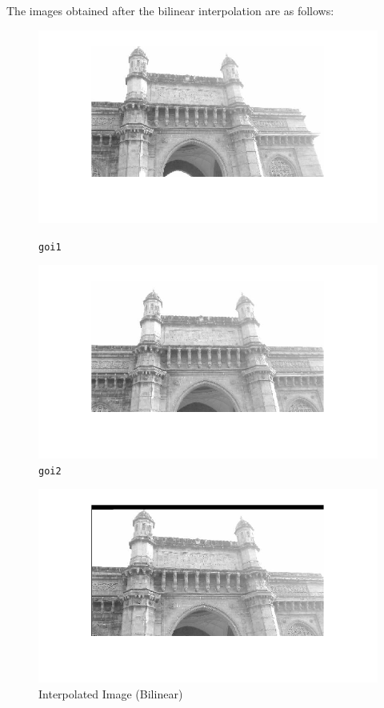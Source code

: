 \documentclass{article}
\begin{document}
The images obtained after the bilinear interpolation are as follows:
\begin{figure}[htbp]
    \centering
    \begin{minipage}[b]{0.45\textwidth}
        \includegraphics[width=\textwidth]{./Q6/bilinear_im1.png}
        \caption{\texttt{goi1}}
    \end{minipage}
    \begin{minipage}[b]{0.45\textwidth}
        \includegraphics[width=\textwidth]{./Q6/bilinear_im2.png}
        \caption{\texttt{goi2}}
    \end{minipage}
\end{figure}
\begin{figure}[!htb]
    \includegraphics[width=\textwidth]{./Q6/bilinear_im4.png}
    \caption{Interpolated Image (Bilinear)}
\end{figure}
\end{document}
